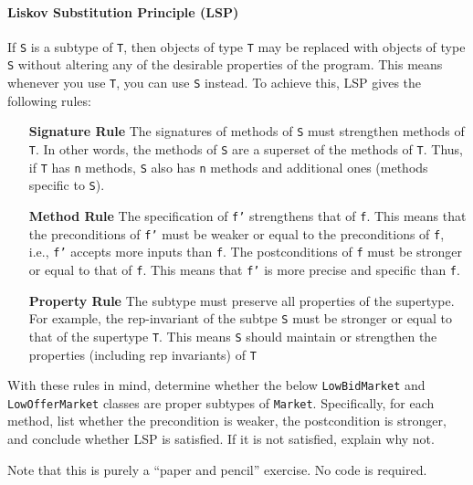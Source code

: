 \documentclass[11pt]{article}
\newcommand{\code}[1]{\texttt{#1}}
\begin{document}
\paragraph{Liskov Substitution Principle (LSP)} If \code{S} is a subtype of \code{T}, then objects of type \code{T} may be replaced with objects of type \code{S} without altering any of the desirable properties of the program. This means whenever you use \code{T}, you can use \code{S} instead. To achieve this, LSP gives the following rules:

\begin{itemize}
\item[\textbf{Signature Rule}] The signatures of methods of \code{S} must strengthen methods of \code{T}. In other words, the methods of \code{S} are a superset of the methods of \code{T}. Thus, if \code{T} has \code{n} methods, \code{S} also has \code{n} methods and additional ones (methods specific to \code{S}). 

\item[\textbf{Method Rule}] The specification of \code{f'} strengthens that of \code{f}. This means that the preconditions of \code{f'} must be weaker or equal to the preconditions of \code{f}, i.e.,  \code{f'} accepts more inputs than \code{f}.  The postconditions of \code{f} must be stronger or equal to that of \code{f}. This means that \code{f'} is more precise and specific than \code{f}.

\item[\textbf{Property Rule}] The subtype must preserve all properties of the supertype.  For example, the rep-invariant of the subtpe \code{S} must be stronger or equal to that of the supertype \code{T}. This means \code{S} should maintain or strengthen the properties (including rep invariants) of \code{T}
\end{itemize}


With these rules in mind, determine whether the below \code{LowBidMarket} and \code{LowOfferMarket} classes are proper subtypes of \code{Market}. Specifically, for each method, list whether the precondition is weaker, the postcondition is stronger, and conclude whether LSP is satisfied.  If it is not satisfied, explain why not.

Note that this is purely a ``paper and pencil'' exercise. No code is required.
\end{document}
